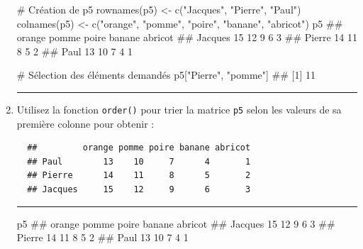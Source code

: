 \documentclass[12pt,twosided, notitlepage]{book}
\newenvironment{Shaded}{}{}
\newcommand{\KeywordTok}[1]{\textcolor[rgb]{0.00,0.00,1.00}{{#1}}}
\newcommand{\StringTok}[1]{\textcolor[rgb]{0.00,0.50,0.50}{{#1}}}
\newcommand{\CommentTok}[1]{\textcolor[rgb]{0.00,0.50,0.00}{{#1}}}
\newcommand{\NormalTok}[1]{{#1}}
\newif \ifsol
\renewenvironment{Shaded}{\begin{snugshade}}{\end{snugshade}}
\begin{document}
\begin{enumerate}
\begin{Shaded}
\begin{Highlighting}[]
\CommentTok{# Création de p5}
\KeywordTok{rownames}\NormalTok{(p5) <-}\StringTok{ }\KeywordTok{c}\NormalTok{(}\StringTok{"Jacques"}\NormalTok{, }\StringTok{"Pierre"}\NormalTok{, }\StringTok{"Paul"}\NormalTok{)}
\KeywordTok{colnames}\NormalTok{(p5) <-}\StringTok{ }\KeywordTok{c}\NormalTok{(}\StringTok{"orange"}\NormalTok{, }\StringTok{"pomme"}\NormalTok{, }\StringTok{"poire"}\NormalTok{, }\StringTok{"banane"}\NormalTok{, }\StringTok{"abricot"}\NormalTok{)}
\NormalTok{p5}
  \NormalTok{##         orange pomme poire banane abricot}
  \NormalTok{## Jacques     15    12     9      6       3}
  \NormalTok{## Pierre      14    11     8      5       2}
  \NormalTok{## Paul        13    10     7      4       1}

\CommentTok{# Sélection des éléments demandés}
\NormalTok{p5[}\StringTok{"Pierre"}\NormalTok{, }\StringTok{"pomme"}\NormalTok{]}
  \NormalTok{## [1] 11}
\end{Highlighting}
\end{Shaded}

  \begin{center} \rule{0.5\linewidth}{\linethickness}\end{center}

  \bigskip  \fi 
\item
  Utilisez la fonction \texttt{order()} pour trier
  la matrice \texttt{p5} selon les valeurs de sa première colonne pour
  obtenir :

\begin{verbatim}
  ##         orange pomme poire banane abricot
  ## Paul        13    10     7      4       1
  ## Pierre      14    11     8      5       2
  ## Jacques     15    12     9      6       3
\end{verbatim}

  \ifsol  \textbf{Indication} Que vaut \texttt{p5{[}c(3,\ 2,\ 1),\ {]}}
  ? Comment utiliser la fonction \texttt{order()} pour automatiser cette
  opération ?\fi  \ifsol 

  \begin{center} \rule{0.5\linewidth}{\linethickness}\end{center}

\begin{Shaded}
\begin{Highlighting}[]
\NormalTok{p5}
  \NormalTok{##         orange pomme poire banane abricot}
  \NormalTok{## Jacques     15    12     9      6       3}
  \NormalTok{## Pierre      14    11     8      5       2}
  \NormalTok{## Paul        13    10     7      4       1}


\end{Highlighting}
\end{Shaded}
\end{enumerate}
\end{document}
